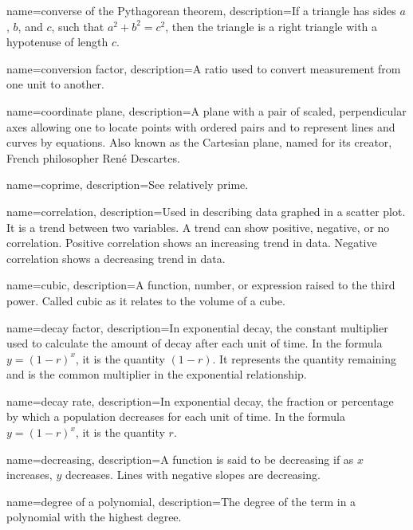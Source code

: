  {
	name=converse of the Pythagorean theorem,
	description={If a triangle has sides $a$, $b$, and $c$, such that $a^2+b^2=c^2$, then the triangle is a right triangle with a hypotenuse of length $c$.}
}

 {
	name=conversion factor,
	description={A ratio used to convert measurement from one unit to another.}
}

 {
	name=coordinate plane,
	description={A plane with a pair of scaled, perpendicular axes allowing one to locate points with ordered pairs and to represent lines and curves by equations. Also known as the Cartesian plane, named for its creator, French philosopher Ren\'{e} Descartes.}
}

 {
	name=coprime,
	description={See \gls{relatively prime}.}
}

 {
	name=correlation,
	description={Used in describing data graphed in a scatter plot. It is a trend between two variables. A trend can show positive, negative, or no correlation. Positive correlation shows an \gls{increasing} trend in data. Negative correlation shows a \gls{decreasing} trend in data.}
}

 {
	name=cubic,
	description={A function, number, or expression raised to the third power. Called cubic as it relates to the volume of a cube.}
}

 {
	name=decay factor,
	description={In exponential decay, the constant multiplier used to calculate the amount of decay after each unit of time. In the formula $y = (1-r)^x$, it is the quantity $(1-r)$. It represents the quantity remaining and is the common multiplier in the exponential relationship.}
}

 {
	name=decay rate,
	description={In exponential decay, the fraction or percentage by which a population decreases for each unit of time. In the formula $y = (1-r)^x$, it is the quantity $r$.}
}

 {
	name=decreasing,
	description={A function is said to be decreasing if as $x$ increases, $y$ decreases. Lines with negative slopes are decreasing.}
}

 {
	name=degree of a polynomial,
	description={The degree of the term in a polynomial with the highest degree.}
}

